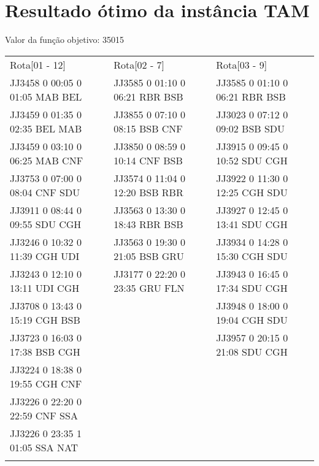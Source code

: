 \chapter{Resultado ótimo da instância TAM}\label{anx:resulttam}

Valor da função objetivo: 35015

\begin{scriptsize}

\begin{longtable}{l l l}

Rota[01 - 12]  & Rota[02 - 7]  & Rota[03 - 9] \\
JJ3458 0 00:05 0 01:05 MAB BEL & JJ3585 0 01:10 0 06:21 RBR BSB & JJ3585 0 01:10 0 06:21 RBR BSB\\
JJ3459 0 01:35 0 02:35 BEL MAB & JJ3855 0 07:10 0 08:15 BSB CNF & JJ3023 0 07:12 0 09:02 BSB SDU\\
JJ3459 0 03:10 0 06:25 MAB CNF & JJ3850 0 08:59 0 10:14 CNF BSB & JJ3915 0 09:45 0 10:52 SDU CGH\\
JJ3753 0 07:00 0 08:04 CNF SDU & JJ3574 0 11:04 0 12:20 BSB RBR & JJ3922 0 11:30 0 12:25 CGH SDU\\
JJ3911 0 08:44 0 09:55 SDU CGH & JJ3563 0 13:30 0 18:43 RBR BSB & JJ3927 0 12:45 0 13:41 SDU CGH\\
JJ3246 0 10:32 0 11:39 CGH UDI & JJ3563 0 19:30 0 21:05 BSB GRU & JJ3934 0 14:28 0 15:30 CGH SDU\\
JJ3243 0 12:10 0 13:11 UDI CGH & JJ3177 0 22:20 0 23:35 GRU FLN & JJ3943 0 16:45 0 17:34 SDU CGH\\
JJ3708 0 13:43 0 15:19 CGH BSB & & JJ3948 0 18:00 0 19:04 CGH SDU\\
JJ3723 0 16:03 0 17:38 BSB CGH & & JJ3957 0 20:15 0 21:08 SDU CGH\\
JJ3224 0 18:38 0 19:55 CGH CNF & & \\
JJ3226 0 22:20 0 22:59 CNF SSA & & \\
JJ3226 0 23:35 1 01:05 SSA NAT & & \\

& & \\


\end{longtable}
\end{scriptsize}
